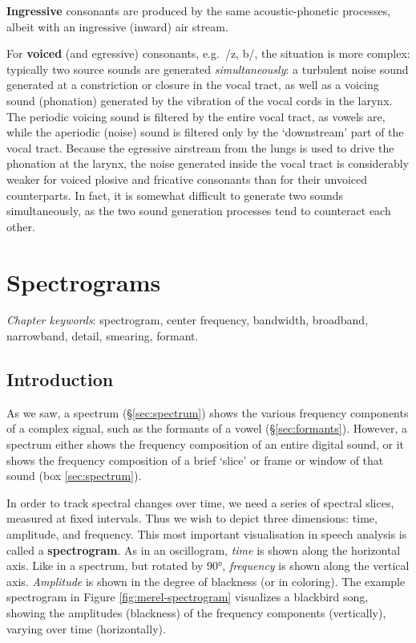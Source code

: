 \documentclass[
]{book}
\begin{document}
\textbf{Ingressive} consonants are produced by the same acoustic-phonetic processes, albeit with an ingressive (inward) air stream.

For \textbf{voiced} (and egressive) consonants, e.g.~/z, b/, the situation is more complex: typically two source sounds are generated \emph{simultaneously}: a turbulent noise sound generated at a constriction or closure in the vocal tract, as well as a voicing sound (phonation) generated by the vibration of the vocal cords in the larynx. The periodic voicing sound is filtered by the entire vocal tract, as vowels are, while the aperiodic (noise) sound is filtered only by the `downstream' part of the vocal tract.
Because the egressive airstream from the lungs is used to drive the phonation at the larynx, the noise generated inside the vocal tract is considerably weaker for voiced plosive and fricative consonants than for their unvoiced counterparts. In fact, it is somewhat difficult to generate two sounds simultaneously, as the two sound generation processes tend to counteract each other.

\chapter{Spectrograms}\label{ch-spectrograms}

\emph{Chapter keywords}: spectrogram, center frequency, bandwidth, broadband, narrowband, detail, smearing, formant.

\section{Introduction}\label{sec:spectrogram-intro}

As we saw, a spectrum (§\ref{sec:spectrum}) shows the various frequency components of a complex signal, such as the formants of a vowel (§\ref{sec:formants}). However, a spectrum either shows the frequency composition of an entire digital sound, or it shows the frequency composition of a brief `slice' or frame or window of that sound (box \ref{sec:spectrum}).

In order to track spectral changes over time, we need a series of spectral slices, measured at fixed intervals. Thus we wish to depict three dimensions: time, amplitude, and frequency. This most important visualisation in speech analysis is called a \textbf{spectrogram}. As in an oscillogram, \emph{time} is shown along the horizontal axis. Like in a spectrum, but rotated by 90°, \emph{frequency} is shown along the vertical axis. \emph{Amplitude} is shown in the degree of blackness (or in coloring).
The example spectrogram in Figure \ref{fig:merel-spectrogram} visualizes a blackbird song, showing the amplitudes (blackness) of the frequency components (vertically), varying over time (horizontally).
\end{document}
